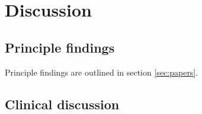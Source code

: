 \section{Discussion}

\subsection{Principle findings}

Principle findings are outlined in section \ref{sec:papers}.

\subsection{Clinical discussion}
